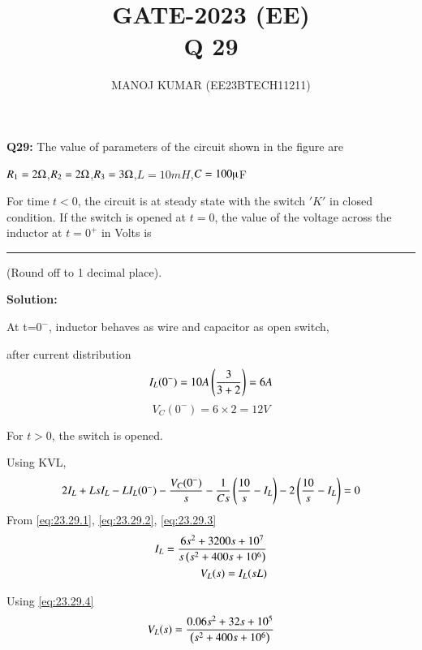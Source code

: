 \documentclass[journal,12pt,twocolumn]{IEEEtran}
\theoremstyle{remark}
\begin{document}

\vspace{3cm}

\title{GATE-2023 (EE) \\Q 29}
\author{MANOJ KUMAR (EE23BTECH11211)}
\maketitle
\newpage

\bigskip

\renewcommand{\thefigure}{\theenumi}
\renewcommand{\thetable}{\theenumi}
\textbf{Q29:}
 The value of parameters of the circuit shown in the figure are
 \begin{center}
 $R_1=2\ohm$,$R_2=2\ohm$,$R_3=3\ohm$,$L=10 mH$,$C=100\micro$F
 \end{center}
 For time \(t<0\), the circuit is at steady state with the switch $ 'K'$ in closed condition. If the switch is opened at $t=0$, the value of the voltage across the inductor 
 at $t=0^{+}$ in Volts is \rule{2cm}{0.4pt} (Round off to 1 decimal place). 


\textbf{Solution:}
\fi


At t=$0^-$, inductor behaves as wire and capacitor as open switch,


after current distribution
\begin{equation}
    I_L(0^-) = 10A\brak{\frac{3}{3+2}}=6 A\\
    \label{eq:23.29.1}
 \end{equation}  
 \begin{equation}
    V_C(0^-)= 6\times2= 12 V
     \label{eq:23.29.2}
\end{equation}

For $t>0$, the switch is opened.


Using KVL,\\
\begin{multline}
2I_L+LsI_L-LI_L(0^-)-\frac{V_C(0^-)}{s}-\frac{1}{Cs}\brak{\frac{10}{s}-I_L}-2\brak{\frac{10}{s}-I_L}=0
   \label{eq:23.29.3}
\end{multline}
From \eqref{eq:23.29.1}, \eqref{eq:23.29.2}, \eqref{eq:23.29.3}
\begin{align}
I_L=\frac{6s^2+3200s+10^7}{s\brak{s^2+400s+10^6}}
\label{eq:23.29.4}\\
V_L(s)=I_L(sL)
\end{align}

Using \eqref{eq:23.29.4}
\begin{align}
V_L(s)=\frac{0.06s^2+32s+10^5}{\brak{s^2+400s+10^6}}
\label{eq:23.29.6}
\end{align}
\end{document}
